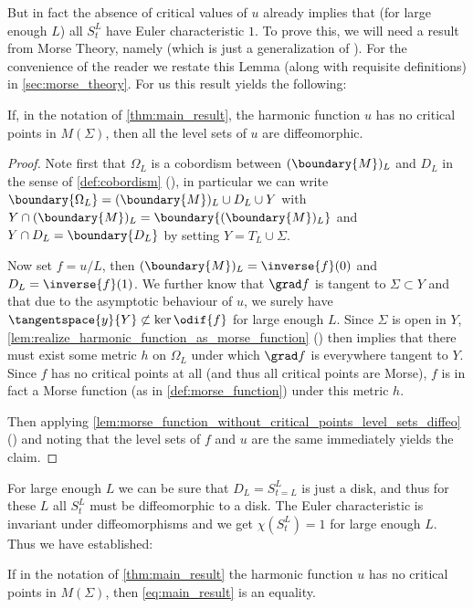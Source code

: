 \documentclass[titlepage,numbers=noenddot,oneside,%
cleardoublepage=empty,paper=a4,fontsize=11pt,%
english,%
]{scrartcl}
\begin{document}
But in fact the absence of critical values of \( u \) already implies that (for large enough \( L \)) all \( S_t^L \) have Euler characteristic \( 1 \). To prove this, we will need a result from Morse Theory, namely \cite[Lemma 2-10]{borodzikMorseTheoryManifolds2016} (which is just a generalization of \cite[Theorem 3.1]{milnorMorseTheory1973}). For the convenience of the reader we restate this Lemma (along with requisite definitions) in \cref{sec:morse_theory}. For us this result yields the following:
\begin{lemma}\label{lem:morse_lemma}
    If, in the notation of \cref{thm:main_result}, the harmonic function \( u \) has no critical points in \( M(\Sigma) \), then all the level sets of \( u \) are diffeomorphic.
\end{lemma}
\begin{proof}
    Note first that \( \Omega_L \) is a cobordism between \( (\boundary{M})_L \) and \( D_L \) in the sense of \cref{def:cobordism} (\cite[Definition 1-1]{borodzikMorseTheoryManifolds2016}), \ie in particular we can write \( \boundary{\Omega_L}=(\boundary{M})_L\cup D_L\cup Y \) with \( Y\cap (\boundary{M})_L=\boundary{(\boundary{M})_L} \) and \( Y\cap D_L=\boundary{D_L} \) by setting \( Y=T_L\cup \Sigma \). 

    Now set \( f=u/L \), then \( (\boundary{M})_L=\inverse{f}(0) \) and \( D_L=\inverse{f}(1) \). We further know that \( \grad f \) is tangent to \( \Sigma\subset Y \) and that due to the asymptotic behaviour of \( u \), we surely have \( \tangentspace{y}{Y}\not\subset \ker{\odif{f}} \) for large enough \( L \). Since \( \Sigma \) is open in \( Y \), \cref{lem:realize_harmonic_function_as_morse_function} (\cite[Lemma 1-7]{borodzikMorseTheoryManifolds2016}) then implies that there must exist some metric \( h \) on \( \Omega_L \) under which \( \grad f \) is everywhere tangent to \( Y \). Since \( f \) has no critical points at all (and thus all critical points are Morse), \( f \) is in fact a Morse function (as in \cref{def:morse_function}) under this metric \( h \).

    Then applying \cref{lem:morse_function_without_critical_points_level_sets_diffeo} (\cite[Lemma 2-10]{borodzikMorseTheoryManifolds2016}) and noting that the level sets of \( f \) and \( u \) are the same immediately yields the claim.
\end{proof}
For large enough \( L \) we can be sure that \( D_L=S_{t=L}^L \) is just a disk, and thus for these \( L \) all \( S_t^L \) must be diffeomorphic to a disk. The Euler characteristic is invariant under diffeomorphisms and we get \( \chi(S_t^L)=1 \) for large enough \( L \). Thus we have established:
\begin{theorem}\label{thm:equality_condition}
    If in the notation of \cref{thm:main_result} the harmonic function \( u \) has no critical points in \( M(\Sigma) \), then \cref{eq:main_result} is an equality.
\end{theorem}
\end{document}
